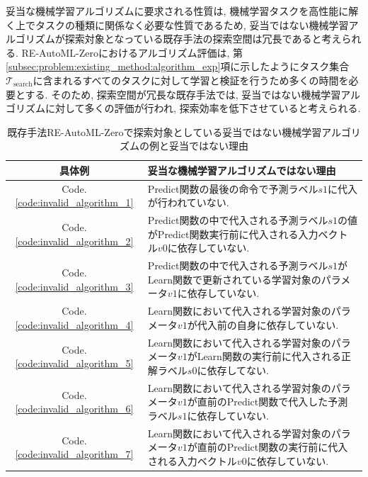 \documentclass[11pt,oneside,openany,report]{jsbook}
\begin{document}
妥当な機械学習アルゴリズムに要求される性質は, 機械学習タスクを高性能に解く上でタスクの種類に関係なく必要な性質であるため, 妥当ではない機械学習アルゴリズムが探索対象となっている既存手法の探索空間は冗長であると考えられる. RE-AutoML-Zeroにおけるアルゴリズム評価は, 第\ref{subsec:problem:existing_method:algorithm_exp}項に示したようにタスク集合$\mathcal{T}_\mathrm{search}$に含まれるすべてのタスクに対して学習と検証を行うため多くの時間を必要とする. そのため, 探索空間が冗長な既存手法では, 妥当ではない機械学習アルゴリズムに対して多くの評価が行われ, 探索効率を低下させていると考えられる.

\newpage

\begin{table}[tbp]
  \caption{既存手法RE-AutoML-Zeroで探索対象としている妥当ではない機械学習アルゴリズムの例と妥当ではない理由}
  \label{table:invalid_algorithms}
  \centering
  \begin{tabular}{c|p{10cm}}
    \hline
    具体例                                  & 妥当な機械学習アルゴリズムではない理由                                                      \\
    \hline \hline
    Code. \ref{code:invalid_algorithm_1} & Predict関数の最後の命令で予測ラベル$s1$に代入が行われていない.                                    \\
    Code. \ref{code:invalid_algorithm_2} & Predict関数の中で代入される予測ラベル$s1$の値がPredict関数実行前に代入される入力ベクトル$v0$に依存していない.       \\
    Code. \ref{code:invalid_algorithm_3} & Predict関数の中で代入される予測ラベル$s1$がLearn関数で更新されている学習対象のパラメータ$v1$に依存していない.        \\
    Code. \ref{code:invalid_algorithm_4} & Learn関数において代入される学習対象のパラメータ$v1$が代入前の自身に依存していない.                           \\
    Code. \ref{code:invalid_algorithm_5} & Learn関数において代入される学習対象のパラメータ$v1$がLearn関数の実行前に代入される正解ラベル$s0$に依存してない.        \\
    Code. \ref{code:invalid_algorithm_6} & Learn関数において代入される学習対象のパラメータ$v1$が直前のPredict関数で代入した予測ラベル$s1$に依存していない.       \\
    Code. \ref{code:invalid_algorithm_7} & Learn関数において代入される学習対象のパラメータ$v1$が直前のPredict関数の実行前に代入される入力ベクトル$v0$に依存していない. \\
    \hline
  \end{tabular}
\end{table}
\end{document}
